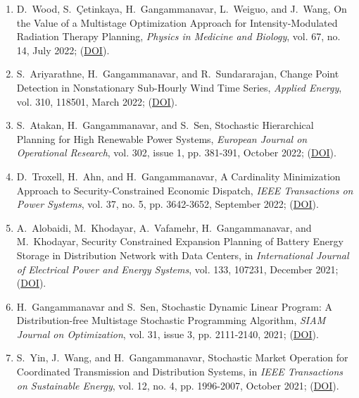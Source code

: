 \documentclass[hyperref, margin]{myResume}
\begin{document}
\begin{resume}
\begin{enumerate}[label=J\arabic*., leftmargin=*]
	\item D.\ Wood\footnotemark[3], S.\ \c{C}etinkaya, H.\ Gangammanavar, L.\ Weiguo, and J.\ Wang, On the Value of a Multistage Optimization Approach for Intensity-Modulated Radiation Therapy Planning, \textit{Physics in Medicine and Biology}, vol. 67, no. 14, July 2022; (\href{https://doi.org/10.1088/1361-6560/ac7a8a}{DOI}).

	\item S.\ Ariyarathne\footnotemark[1], H.\ Gangammanavar, and R.\ Sundararajan, Change Point Detection in Nonstationary Sub-Hourly Wind Time Series, \textit{Applied Energy}, vol. 310, 118501, March 2022; (\href{https://doi.org/10.1016/j.apenergy.2021.118501}{DOI}).
	
	\item S.\ Atakan, H.\ Gangammanavar, and S.\ Sen, Stochastic Hierarchical Planning for High Renewable Power Systems, \textit{European Journal on Operational Research}, vol. 302, issue 1, pp. 381-391, October 2022; (\href{https://doi.org/10.1016/j.ejor.2021.12.042}{DOI}).
	
	\item D.\ Troxell\footnotemark[2], H.\ Ahn, and H.\ Gangammanavar, A Cardinality Minimization Approach to Security-Constrained Economic Dispatch, \textit{IEEE Transactions on Power Systems}, vol. 37, no. 5, pp. 3642-3652, September 2022; (\href{https://doi.org/10.1109/TPWRS.2021.3133379}{DOI}).

	\item A.\ Alobaidi\footnotemark[3], M.\ Khodayar, A.\ Vafamehr, H.\ Gangammanavar, and M.\ Khodayar, Security Constrained Expansion Planning of Battery Energy Storage in Distribution Network with Data Centers, in \textit{International Journal of Electrical Power and Energy Systems}, vol. 133, 107231, December 2021; (\href{https://doi.org/10.1016/j.ijepes.2021.107231}{DOI}).

	\item H.\ Gangammanavar and S.\ Sen, Stochastic Dynamic Linear Program: A Distribution-free Multistage Stochastic Programming Algorithm, \textit{SIAM Journal on Optimization}, vol. 31, issue 3, pp. 2111-2140, 2021; (\href{https://doi.org/10.1137/19M1290735}{DOI}).

	\item S.\ Yin\footnotemark[3], J.\ Wang, and H.\ Gangammanavar, Stochastic Market Operation for Coordinated Transmission and Distribution Systems, in \textit{IEEE Transactions on Sustainable Energy}, vol. 12, no. 4, pp. 1996-2007, October 2021; (\href{https://doi.org/10.1109/TSTE.2021.3076037}{DOI}).


\end{enumerate}
\end{resume}
\end{document}
